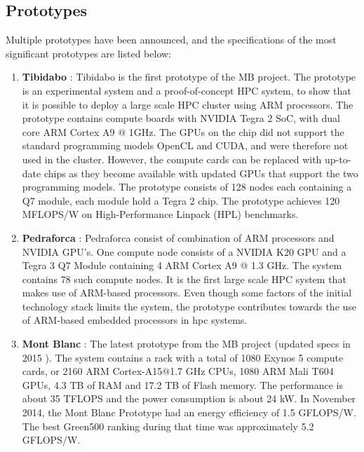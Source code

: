 \subsection{Prototypes}
Multiple prototypes have been announced, and the specifications of the most significant prototypes are listed below:
\begin{enumerate}
\item \textbf{Tibidabo} \cite{a:MB:Tib}: Tibidabo is the first prototype of the MB project. The prototype is an experimental system and a proof-of-concept HPC system, to show that it is possible to deploy a large scale HPC cluster using ARM processors. The prototype contains compute boards with NVIDIA Tegra 2 SoC, with dual core ARM Cortex A9 @ 1GHz. The GPUs on the chip did not support the standard programming models OpenCL and CUDA, and were therefore not used in the cluster. However, the compute cards can be replaced with up-to-date chips as they become available with updated GPUs that support the two programming models. The prototype consists of 128 nodes each containing a Q7 module, each module hold a Tegra 2 chip. The prototype achieves 120 MFLOPS/W on High-Performance Linpack (HPL) benchmarks.
\item \textbf{Pedraforca} \cite{m:MB:Pedr}: Pedraforca consist of combination of ARM processors and NVIDIA GPU's. One compute node consists of a NVIDIA K20 GPU and a Tegra 3 Q7 Module containing 4 ARM Cortex A9 @ 1.3 GHz. The system contains 78 such compute nodes. It is the first large scale HPC system that makes use of ARM-based processors. Even though some factors of the initial technology stack limits the system, the prototype contributes towards the use of ARM-based embedded processors in \gls{hpc} systems.
\item \textbf{Mont Blanc} \cite{m:MB:MB-prot}: The latest prototype from the MB project (updated specs in 2015 \cite{m:MB-15}). The system contains a rack with a total of 1080 Exynos 5 compute cards, or  2160 ARM Cortex-A15@1.7 GHz CPUs, 1080 ARM Mali T604 GPUs, 4.3 TB of RAM and 17.2 TB of Flash memory. The performance is about 35 TFLOPS and the power consumption is about 24 kW. In November 2014, the Mont Blanc Prototype had an energy efficiency of 1.5 GFLOPS/W. The best Green500 ranking during that time was approximately 5.2 GFLOPS/W.
\end{enumerate}



